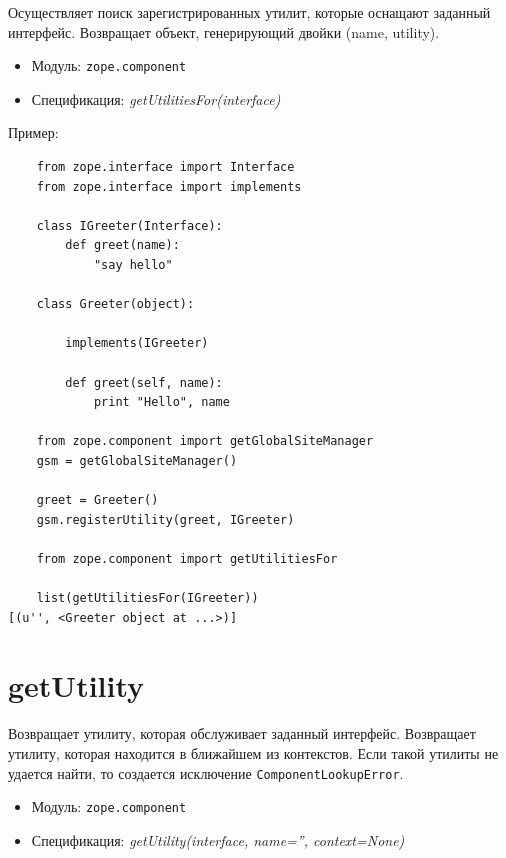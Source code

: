 \documentclass[a4paper,openany,twoside,final]{book}
\providecommand*{\DUroletitlereference}[1]{\textsl{#1}}
\begin{document}
Осуществляет поиск зарегистрированных утилит, которые оснащают заданный интерфейс.  Возвращает объект, генерирующий двойки (name, utility).

\begin{itemize}

\item Модуль: \texttt{zope.component}

\item Спецификация: \DUroletitlereference{getUtilitiesFor(interface)}

\end{itemize}

Пример:

\begin{verbatim}
    from zope.interface import Interface
    from zope.interface import implements

    class IGreeter(Interface):
        def greet(name):
            "say hello"

    class Greeter(object):

        implements(IGreeter)

        def greet(self, name):
            print "Hello", name

    from zope.component import getGlobalSiteManager
    gsm = getGlobalSiteManager()

    greet = Greeter()
    gsm.registerUtility(greet, IGreeter)

    from zope.component import getUtilitiesFor

    list(getUtilitiesFor(IGreeter))
[(u'', <Greeter object at ...>)]
\end{verbatim}


\section*{getUtility%
  \label{getutility}%
}

Возвращает утилиту, которая обслуживает заданный интерфейс.  Возвращает утилиту, которая находится в ближайшем из контекстов.  Если такой утилиты не удается найти, то создается исключение \texttt{ComponentLookupError}.

\begin{itemize}

\item Модуль: \texttt{zope.component}

\item Спецификация: \DUroletitlereference{getUtility(interface, name='', context=None)}

\end{itemize}
\end{document}
